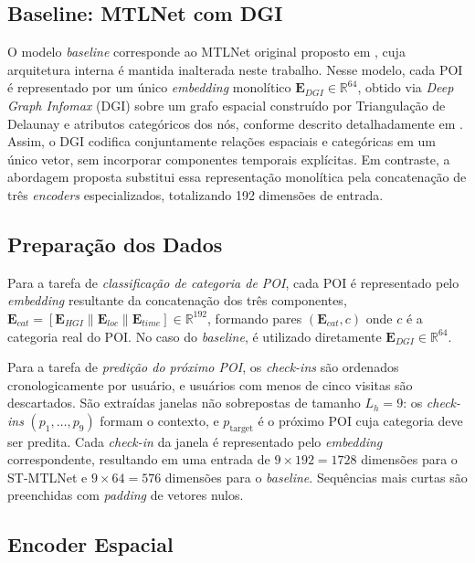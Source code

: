 \subsection{Baseline: MTLNet com DGI}

O modelo \textit{baseline} corresponde ao MTLNet original proposto em \cite{silva2025mtlnet}, cuja arquitetura interna é mantida inalterada neste trabalho. Nesse modelo, cada POI é representado por um único \textit{embedding} monolítico $\mathbf{E}_{DGI} \in \mathbb{R}^{64}$, obtido via \textit{Deep Graph Infomax} (DGI) \cite{velickovic2019deep} sobre um grafo espacial construído por Triangulação de Delaunay e atributos categóricos dos nós, conforme descrito detalhadamente em \cite{silva2025mtlnet}. Assim, o DGI codifica conjuntamente relações espaciais e categóricas em um único vetor, sem incorporar componentes temporais explícitas. Em contraste, a abordagem proposta substitui essa representação monolítica pela concatenação de três \textit{encoders} especializados, totalizando 192 dimensões de entrada.


\subsection{Preparação dos Dados}

Para a tarefa de \textit{classificação de categoria de POI}, cada POI é representado pelo \textit{embedding} resultante da concatenação dos três componentes, $\mathbf{E}_{cat} = [\mathbf{E}_{HGI} \| \mathbf{E}_{loc} \| \mathbf{E}_{time}] \in \mathbb{R}^{192}$, formando pares $(\mathbf{E}_{cat}, c)$ onde $c$ é a categoria real do POI. No caso do \textit{baseline}, é utilizado diretamente $\mathbf{E}_{DGI} \in \mathbb{R}^{64}$.

Para a tarefa de \textit{predição do próximo POI}, os \textit{check-ins} são ordenados cronologicamente por usuário, e usuários com menos de cinco visitas são descartados. São extraídas janelas não sobrepostas de tamanho $L_h = 9$: os \textit{check-ins} $(p_1, \dots, p_9)$ formam o contexto, e $p_{\text{target}}$ é o próximo POI cuja categoria deve ser predita. Cada \textit{check-in} da janela é representado pelo \textit{embedding} correspondente, resultando em uma entrada de $9 \times 192 = 1728$ dimensões para o ST-MTLNet e $9 \times 64 = 576$ dimensões para o \textit{baseline}. Sequências mais curtas são preenchidas com \textit{padding} de vetores nulos.

\subsection{Encoder Espacial}

